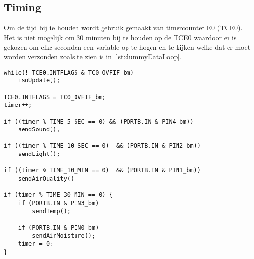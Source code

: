 \subsection{Timing}
Om de tijd bij te houden wordt gebruik gemaakt van timercounter E0 (TCE0). Het is niet mogelijk om 30 minuten bij te houden op de TCE0 waardoor er is gekozen om elke seconden een variable op te hogen en te kijken welke dat er moet worden verzonden zoals te zien is in \autoref{lst:dummyDataLoop}.
\begin{lstlisting}[caption={dummyData loop},captionpos=b,label={lst:dummyDataLoop},style=c]
while(! TCE0.INTFLAGS & TC0_OVFIF_bm)
    isoUpdate();

TCE0.INTFLAGS = TC0_OVFIF_bm;
timer++;

if ((timer % TIME_5_SEC == 0) && (PORTB.IN & PIN4_bm))
    sendSound();

if ((timer % TIME_10_SEC == 0)  && (PORTB.IN & PIN2_bm))
    sendLight();

if ((timer % TIME_10_MIN == 0)  && (PORTB.IN & PIN1_bm))
    sendAirQuality();

if (timer % TIME_30_MIN == 0) {
    if (PORTB.IN & PIN3_bm)
        sendTemp();
    
    if (PORTB.IN & PIN0_bm)
        sendAirMoisture();
    timer = 0;
}
\end{lstlisting}